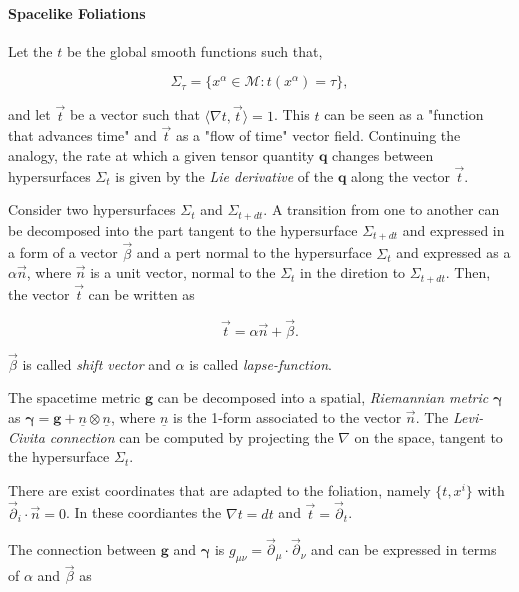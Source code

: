 \paragraph{Spacelike Foliations}


Let the $t$ be the global smooth functions such that, 

\begin{equation}
\Sigma_{\tau} = \{x^{\alpha}\in\mathcal{M}: t(x^{\alpha})=\tau\},
\end{equation}

and let $\vec{t}$ be a vector such that $\langle\nabla t, \vec{t}\rangle = 1$. 
This $t$ can be seen as a "function that advances time" and $\vec{t}$ as a "flow of time" vector field.
Continuing the analogy, the rate at which a given tensor quantity $\boldsymbol{q}$ changes between hypersurfaces $\Sigma_t$ is given by the \textit{Lie derivative} of the $\boldsymbol{q}$ along the vector $\vec{t}$.

Consider two hypersurfaces $\Sigma_t$ and $\Sigma_{t+dt}$. 
A transition from one to another can be decomposed into the part tangent to the hypersurface $\Sigma_{t+dt}$ and expressed in a form of a vector $\vec{\beta}$ and a pert normal to the hypersurface $\Sigma_t$ and expressed as a $\alpha \vec{n}$, where $\vec{n}$ is a unit vector, normal to the $\Sigma_t$ in the diretion to $\Sigma_{t+dt}$. 
Then, the vector $\vec{t}$ can be written as 

\begin{equation}
\vec{t} = \alpha\vec{n}+\vec{\beta}.
\end{equation}

$\vec{\beta}$ is called \textit{shift vector} and $\alpha$ is called \textit{lapse-function}. 

The spacetime metric $\boldsymbol{g}$ can be decomposed into a spatial, \textit{Riemannian metric} $\boldsymbol{\gamma}$ as $\boldsymbol{\gamma} = \boldsymbol{g} + \underline{n} \otimes \underline{n}$, where $\underline{n}$ is the 1-form associated to the vector $\vec{n}$. 
The \textit{Levi-Civita connection} can be computed by projecting the $\nabla$ on the space, tangent to the hypersurface $\Sigma_t$.

There are exist coordinates that are adapted to the foliation, namely $\{t, x^i\}$ with $\vec{\partial}_i\cdot \vec{n} = 0$. 
In these coordiantes the $\nabla t = dt$ and $\vec{t} = \vec{\partial}_t$. 

The connection between $\boldsymbol{g}$ and $\boldsymbol{\gamma}$ is $g_{\mu\nu}=\vec{\partial}_{\mu}\cdot\vec{\partial}_{\nu} $ and can be expressed in terms of $\alpha$ and $\vec{\beta}$ as

